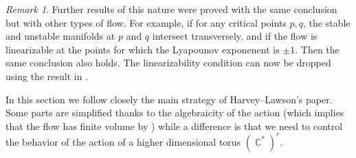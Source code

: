 \documentclass[12pt]{amsbook}%
\newtheorem{cor}[thm]{Corollary}
\theoremstyle{definition}
\theoremstyle{remark}
\newtheorem{rem}[thm]{Remark}
\numberwithin{section}{chapter}
\numberwithin{subsection}{section}
\numberwithin{figure}{chapter}
\DeclareMathOperator{\C}{\mathbb{C}}
\DeclareMathOperator{\Th}{Th}
\newcommand\intcur[1]{\llbracket #1 \rrbracket}
\def\cF{{\mathscr{F}}}
\begin{document}
{{\begin{rem} Further results of this nature were proved with the same conclusion but with other types of flow. For example, if for any critical points $p,q$, the stable and unstable manifolds at $p$ and $q$ intersect transversely, and if the flow is linearizable at the points for which the Lyapounov exponenent is $\pm 1$. Then the same conclusion also holds. The linearizability condition can now be dropped using the result in \cite[Theorem 2]{meddane_axiom_A}.    
\end{rem}

In this section we follow closely the main strategy of Harvey--Lawson's paper. Some parts are simplified thanks to the algebraicity of the action (which implies that the flow has finite volume by \cite[Proposition 1.7]{harvey_lawson_survey}) while a difference is that we need to control the behavior of the action of a higher dimensional torus $(\C^*)^r$. 
}}
\end{document}
